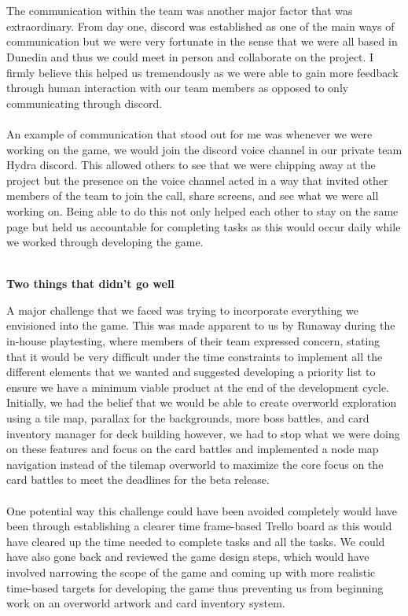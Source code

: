 \documentclass[a4paper]{article}
\begin{document}
\\\\
The communication within the team was another major factor that was extraordinary. From day one, discord was established as one of the main ways of communication but we were very fortunate in the sense that we were all based in Dunedin and thus we could meet in person and collaborate on the project. I firmly believe this helped us tremendously as we were able to gain more feedback through human interaction with our team members as opposed to only communicating through discord.
\\\\
An example of communication that stood out for me was whenever we were working on the game, we would join the discord voice channel in our private team Hydra discord. This allowed others to see that we were chipping away at the project but the presence on the voice channel acted in a way that invited other members of the team to join the call, share screens, and see what we were all working on. Being able to do this not only helped each other to stay on the same page but held us accountable for completing tasks as this would occur daily while we worked through developing the game. 
\\\\
\begin{center}
{\large \textbf{Two things that didn't go well}}
\end{center}
A major challenge that we faced was trying to incorporate everything we envisioned into the game. This was made apparent to us by Runaway during the in-house playtesting, where members of their team expressed concern, stating that it would be very difficult under the time constraints to implement all the different elements that we wanted and suggested developing a priority list to ensure we have a minimum viable product at the end of the development cycle. Initially, we had the belief that we would be able to create overworld exploration using a tile map, parallax for the backgrounds, more boss battles, and card inventory manager for deck building however, we had to stop what we were doing on these features and focus on the card battles and implemented a node map navigation instead of the tilemap overworld to maximize the core focus on the card battles to meet the deadlines for the beta release. 
\\\\
One potential way this challenge could have been avoided completely would have been through establishing a clearer time frame-based Trello board as this would have cleared up the time needed to complete tasks and all the tasks. We could have also gone back and reviewed the game design steps, which would have involved narrowing the scope of the game and coming up with more realistic time-based targets for developing the game thus preventing us from beginning work on an overworld artwork and card inventory system.
\end{document}
